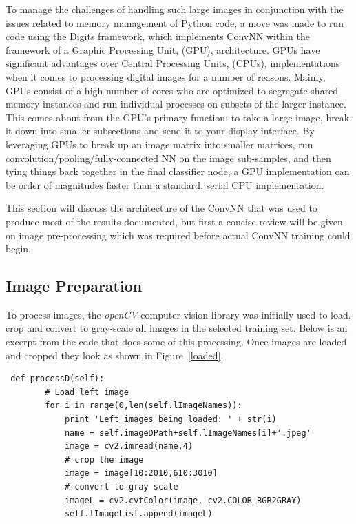 \documentclass[letterpaper,12pt]{article}
\newcommand{\figref}[1]{Figure~\ref{#1}}
\begin{document}
To manage the challenges of handling such large images in conjunction with the issues related to memory management of Python code, a move was made to run code using the Digits framework, which implements ConvNN within the framework of a Graphic Processing Unit, (GPU), architecture. GPUs have significant advantages over Central Processing Units, (CPUs), implementations when it comes to processing digital images for a number of reasons. Mainly, GPUs consist of a high number of cores who are optimized to segregate shared memory instances and run individual processes on subsets of the larger instance. This comes about from the GPU's  primary function: to take a large image, break it down into smaller subsections and send it to your display interface. By leveraging GPUs to break up an image matrix into smaller matrices, run convolution/pooling/fully-connected NN on the image sub-samples, and then tying things back together in the final classifier node, a GPU implementation can be order of magnitudes faster than a standard, serial CPU implementation.

This section will discuss the architecture of the ConvNN that was used to produce most of the results documented, but first a concise review will be given on image pre-processing which was required before actual ConvNN training could begin.

\subsection{Image Preparation}

To process images, the \textit{openCV} computer vision library was initially used to load, crop and convert to gray-scale all images in the selected training set. Below is an excerpt from the code that does some of this processing. Once images are loaded and cropped they look as shown in \figref{loaded}.

\begin{verbatim}
 def processD(self):
        # Load left image
        for i in range(0,len(self.lImageNames)):
            print 'Left images being loaded: ' + str(i)
            name = self.imageDPath+self.lImageNames[i]+'.jpeg'
            image = cv2.imread(name,4)
            # crop the image
            image = image[10:2010,610:3010]
            # convert to gray scale
            imageL = cv2.cvtColor(image, cv2.COLOR_BGR2GRAY)
            self.lImageList.append(imageL)
\end{verbatim}
\end{document}
